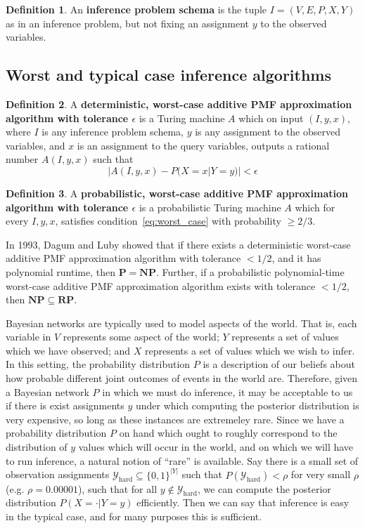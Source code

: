 \documentclass{article}
\renewcommand{\P}{\mathbf{P}}
\newcommand{\NP}{\mathbf{NP}}
\newcommand{\RP}{\mathbf{RP}}
\theoremstyle{definition}
\newtheorem{defn}{Definition}
\theoremstyle{remark}
\begin{document}
\begin{defn}
An \textbf{inference problem schema} is the tuple $I = (V, E, P, X, Y)$ as in an inference problem, but not fixing an assignment $y$ to the observed variables.
\end{defn}

\subsection{Worst and typical case inference algorithms}

\begin{defn}
A \textbf{deterministic, worst-case additive PMF approximation algorithm with tolerance $\epsilon$} is a Turing machine $A$ which on input
$(I, y, x)$, where $I$ is any inference problem schema, $y$ is any assignment to the observed variables, and $x$ is an assignment to the query variables, outputs a rational number $A(I, y, x)$ such that
\begin{equation} \label{eq:worst_case}
|A(I, y, x) - P(X = x | Y = y)| < \epsilon
\end{equation}
\end{defn}
\begin{defn}
A \textbf{probabilistic, worst-case additive PMF approximation algorithm with tolerance $\epsilon$} is a probabilistic Turing machine $A$ which for every $I, y, x$, satisfies condition~\ref{eq:worst_case} with probability $\geq 2/3$.
\end{defn}

In 1993, Dagum and Luby \cite{dagum1993} showed that if there exists a deterministic worst-case additive PMF approximation algorithm with tolerance $< 1/2$, and it has polynomial runtime, then $\P = \NP$.
Further, if a probabilistic polynomial-time worst-case additive PMF approximation algorithm exists with tolerance $< 1/2$, then $\NP \subseteq \RP$.

Bayesian networks are typically used to model aspects of the world.
That is, each variable in $V$ represents some aspect of the world; $Y$ represents a set of values which we have observed; and $X$ represents a set of values which we wish to infer.
In this setting, the probability distribution $P$ is a description of our beliefs about how probable different joint outcomes of events in the world are.
Therefore, given a Bayesian network $P$ in which we must do inference, it may be acceptable to us if there is exist assignments $y$ under which computing the posterior distribution is very expensive, so long as these instances are extremeley rare.
Since we have a probability distribution $P$ on hand which ought to roughly correspond to the distribution of $y$ values which will occur in the world, and on which we will have to run inference, a natural notion of ``rare'' is available.
Say there is a small set of observation assignments $\mathcal{Y}_\text{hard} \subseteq \{0, 1\}^{|Y|}$ such that $P(\mathcal{Y}_\text{hard}) < \rho$ for very small $\rho$ (e.g. $\rho = 0.00001$), such that for all $y \notin \mathcal{Y}_\text{hard}$, we can compute the posterior distribution $P(X = \cdot | Y = y)$ efficiently.
Then we can say that inference is easy in the typical case, and for many purposes this is sufficient.
\end{document}
